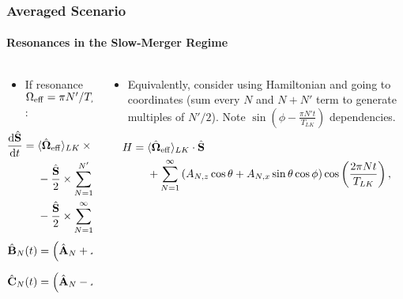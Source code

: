 \documentclass[dvipsnames, 8pt]{beamer}
\newcommand*{\rd}[2]{\frac{\mathrm{d}#1}{\mathrm{d}#2}}
\newcommand*{\bm}[1]{\boldsymbol{\mathbf{#1}}}
\newcommand*{\uv}[1]{\hat{\bm{#1}}}
\newcommand*{\ev}[1]{\langle#1\rangle}
\newcommand*{\p}[1]{\left(#1\right)}
\begin{document}
\begin{frame}
    \frametitle{Averaged Scenario}
    \framesubtitle{Resonances in the Slow-Merger Regime}

    \begin{columns}
        \begin{column}{0.5\textwidth}
            \begin{itemize}
                \item If resonance $\Omega_{\rm eff} = \pi N'/T_{LK}$:
            \end{itemize}
            \begin{align}
                \rd{\uv{S}}{t} ={}&
                    \ev{\uv{\Omega}_{\rm eff}}_{LK}
                        \times \uv{S}\nonumber\\
                    &-\frac{\uv{S}}{2} \times \sum\limits_{N = 1}^{N'} \uv{A}_N
                        \cos \p{\frac{2\pi N t}{T_{LK}}}\nonumber\\
                    &- \frac{\uv{S}}{2} \times \sum\limits_{N = 1}^\infty
                        \uv{B}_N \cos\p{\Omega_{\rm eff}t}
                        - \uv{C}_N \sin \p{\Omega_{\rm eff}t},\\
                \uv{B}_N(t) &= \p{\uv{A}_N + \uv{A}_{N + N'}}\cos \p{\frac{\pi
                    \p{N + N'}t}{T_{LK}}},\\
                \uv{C}_N(t) &= \p{\uv{A}_N - \uv{A}_{N + N'}}\sin \p{\frac{\pi
                    \p{N + N'}t}{T_{LK}}}.
            \end{align}
        \end{column}
        \begin{column}{0.5\textwidth}
            \begin{itemize}
                \item Equivalently, consider using Hamiltonian and going to
                    coordinates (sum every $N$ and $N + N'$ term to generate
                    multiples of $N'/2$). Note $\sin\p{\phi - \frac{\pi N'
                    t}{T_{LK}}}$ dependencies.
            \end{itemize}
            \begin{align}
                H ={}&
                    \ev{\uv{\Omega}_{\rm eff}}_{LK}
                        \cdot \uv{S}\nonumber\\
                    &+ \sum\limits_{N = 1}^\infty \p{A_{N,z}\cos\theta
                        + A_{N,x}\sin\theta \cos \phi}
                        \cos \p{\frac{2\pi N t}{T_{LK}}},\\

\end{align}
\end{column}
\end{columns}
\end{frame}
\end{document}
